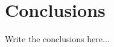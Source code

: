 \def\baselinestretch{1}
\chapter{Conclusions}
\label{chap:conclusions}
\ifpdf
    \graphicspath{{Conclusions/Figures/PNG/}{Conclusions/Figures/PDF/}{Conclusions/Figures/}}
\else
    \graphicspath{{Conclusions/Figures/EPS/}{Conclusions/Figures/}}
\fi
\def\baselinestretch{1.66}

Write the conclusions here...


